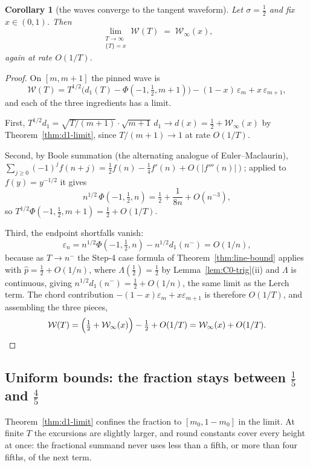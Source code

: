 \documentclass[11pt]{article}
\newtheorem{corollary}[theorem]{Corollary}
\theoremstyle{definition}
\begin{document}
\begin{corollary}[the waves converge to the tangent waveform]\label{cor:W-limit}
Let $\sigma=\tfrac12$ and fix $x\in(0,1)$. Then
\[
\lim_{\substack{T\to\infty\\ \{T\}=x}}\mathcal W(T)
\;=\;\mathcal W_{\infty}(x),
\]
again at rate $O(1/T)$.
\end{corollary}

\begin{proof}
On $[m,m+1]$ the pinned wave is
\[
\mathcal W(T)
=T^{1/2}\bigl(d_1(T)-\Phi(-1,\tfrac12,m+1)\bigr)
-(1-x)\,\varepsilon_m+x\,\varepsilon_{m+1},
\]
and each of the three ingredients has a limit.

First, $T^{1/2}d_1=\sqrt{T/(m+1)}\cdot\sqrt{m+1}\,d_1\to
d(x)=\tfrac12+\mathcal W_{\infty}(x)$ by Theorem~\ref{thm:d1-limit},
since $T/(m+1)\to1$ at rate $O(1/T)$.

Second, by Boole summation (the alternating analogue of
Euler--Maclaurin), $\sum_{j\ge0}(-1)^{j}f(n+j)=\tfrac12f(n)
-\tfrac14f'(n)+O(|f'''(n)|)$; applied to $f(y)=y^{-1/2}$ it gives
\[
n^{1/2}\,\Phi(-1,\tfrac12,n)=\tfrac12+\frac1{8n}+O(n^{-3}),
\]
so $T^{1/2}\Phi(-1,\tfrac12,m+1)=\tfrac12+O(1/T)$.

Third, the endpoint shortfalls vanish:
\[
\varepsilon_n
=n^{1/2}\Phi(-1,\tfrac12,n)-n^{1/2}d_1(n^-)
=O(1/n),
\]
because as $T\to n^{-}$ the Step-4 case formula of
Theorem~\ref{thm:line-bound} applies with $\hat p=\tfrac12+O(1/n)$, where
$\Lambda(\tfrac12)=\tfrac12$ by Lemma~\ref{lem:C0-trig}(ii) and $\Lambda$
is continuous, giving $n^{1/2}d_1(n^-)=\tfrac12+O(1/n)$, the same limit
as the Lerch term. The chord contribution
$-(1-x)\varepsilon_m+x\varepsilon_{m+1}$ is therefore $O(1/T)$, and
assembling the three pieces,
\[
\mathcal W(T)
=\Bigl(\tfrac12+\mathcal W_{\infty}(x)\Bigr)-\tfrac12+O(1/T)
=\mathcal W_{\infty}(x)+O(1/T). \qedhere
\]
\end{proof}

\subsection{Uniform bounds: the fraction stays between \texorpdfstring{$\tfrac15$ and $\tfrac45$}{1/5 and 4/5}}\label{sec:d1-bounds}

Theorem~\ref{thm:d1-limit} confines the fraction to $[m_0,1-m_0]$ in the
limit. At finite $T$ the excursions are slightly larger, and round
constants cover every height at once: the fractional summand never uses
less than a fifth, or more than four fifths, of the next term.
\end{document}
